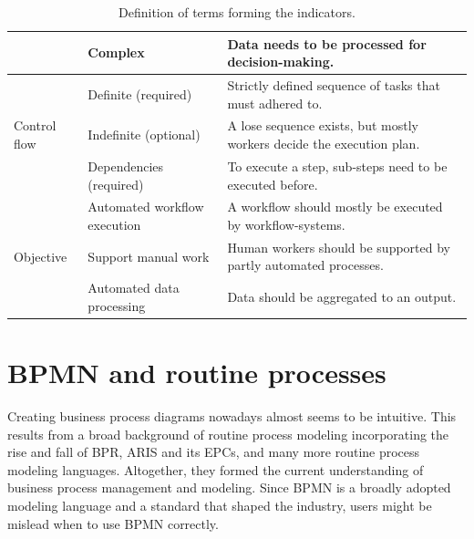 \begin{table}[]
{\begin{tabular}{@{}lll@{}}
                                              & Complex                                                                                      & Data needs to be processed for decision-making.                                                                                    \\ \midrule
\multirow{3}{*}{Control flow}                 & Definite (required)                                                                          & Strictly defined sequence of tasks that must adhered to.                                                                           \\ \cmidrule(l){2-3} 
                                              & Indefinite (optional)                                                                        & A lose sequence exists, but mostly workers decide the execution plan.                                                              \\ \cmidrule(l){2-3} 
                                              & Dependencies (required)                                                                      & To execute a step, sub-steps need to be executed before.                                                                           \\ \midrule
\multirow{3}{*}{Objective}                    & Automated workflow execution                                                                 & A workflow should mostly be executed by workflow-systems.                                                                          \\ \cmidrule(l){2-3} 
                                              & Support manual work                                                                          & Human workers should be supported by partly automated processes.                                                                   \\ \cmidrule(l){2-3} 
                                              & Automated data processing                                                                    & Data should be aggregated to an output.                                                                                            \\ \bottomrule
\end{tabular}%
}
\caption{Definition of terms forming the indicators.}
\label{tab:indicators_terms_definition}
\end{table}

\section{BPMN and routine processes}
\label{section:BPMNindicators}
Creating business process diagrams nowadays almost seems to be intuitive. This results from a broad background of routine process modeling incorporating the rise and fall of \ac{BPR}, \ac{ARIS} and its EPCs, and many more routine process modeling languages. Altogether, they formed the current understanding of business process management and modeling. 
Since BPMN is a broadly adopted modeling language and a standard that shaped the industry, users might be mislead when to use BPMN correctly.  


